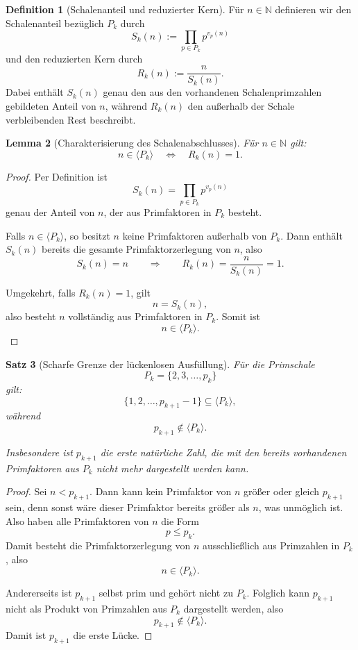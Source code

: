 \documentclass[11pt,a4paper]{article}
\newtheorem{satz}{Satz}
\newtheorem{lemma}[satz]{Lemma}
\theoremstyle{definition}
\newtheorem{definition}[satz]{Definition}
\theoremstyle{remark}
\begin{document}
	\begin{definition}[Schalenanteil und reduzierter Kern]
		Für \(n\in\mathbb N\) definieren wir den Schalenanteil bezüglich \(P_k\) durch
		\[
		S_k(n):=\prod_{p\in P_k} p^{v_p(n)}
		\]
		und den reduzierten Kern durch
		\[
		R_k(n):=\frac{n}{S_k(n)}.
		\]
		Dabei enthält \(S_k(n)\) genau den aus den vorhandenen Schalenprimzahlen gebildeten Anteil
		von \(n\), während \(R_k(n)\) den außerhalb der Schale verbleibenden Rest beschreibt.
	\end{definition}
	
	\begin{lemma}[Charakterisierung des Schalenabschlusses]
		\label{lem:schalenabschluss}
		Für \(n\in\mathbb N\) gilt:
		\[
		n\in \langle P_k\rangle
		\quad\Longleftrightarrow\quad
		R_k(n)=1.
		\]
	\end{lemma}
	
	\begin{proof}
		Per Definition ist
		\[
		S_k(n)=\prod_{p\in P_k} p^{v_p(n)}
		\]
		genau der Anteil von \(n\), der aus Primfaktoren in \(P_k\) besteht.
		
		\medskip
		\noindent
		Falls \(n\in \langle P_k\rangle\), so besitzt \(n\) keine Primfaktoren außerhalb von \(P_k\).
		Dann enthält \(S_k(n)\) bereits die gesamte Primfaktorzerlegung von \(n\), also
		\[
		S_k(n)=n
		\qquad\Longrightarrow\qquad
		R_k(n)=\frac{n}{S_k(n)}=1.
		\]
		
		\medskip
		\noindent
		Umgekehrt, falls \(R_k(n)=1\), gilt
		\[
		n=S_k(n),
		\]
		also besteht \(n\) vollständig aus Primfaktoren in \(P_k\). Somit ist
		\[
		n\in \langle P_k\rangle.
		\]
	\end{proof}
	
	\begin{satz}[Scharfe Grenze der lückenlosen Ausfüllung]
		\label{satz:scharfe_grenze_schale}
		Für die Primschale
		\[
		P_k=\{2,3,\dots,p_k\}
		\]
		gilt:
		\[
		\{1,2,\dots,p_{k+1}-1\}\subseteq \langle P_k\rangle,
		\]
		während
		\[
		p_{k+1}\notin \langle P_k\rangle.
		\]
		
		Insbesondere ist \(p_{k+1}\) die erste natürliche Zahl, die mit den bereits
		vorhandenen Primfaktoren aus \(P_k\) nicht mehr dargestellt werden kann.
	\end{satz}
	
	\begin{proof}
		Sei \(n<p_{k+1}\). Dann kann kein Primfaktor von \(n\) größer oder gleich \(p_{k+1}\) sein,
		denn sonst wäre dieser Primfaktor bereits größer als \(n\), was unmöglich ist. Also haben
		alle Primfaktoren von \(n\) die Form
		\[
		p\le p_k.
		\]
		Damit besteht die Primfaktorzerlegung von \(n\) ausschließlich aus Primzahlen in \(P_k\), also
		\[
		n\in \langle P_k\rangle.
		\]
		
		Andererseits ist \(p_{k+1}\) selbst prim und gehört nicht zu \(P_k\). Folglich kann
		\(p_{k+1}\) nicht als Produkt von Primzahlen aus \(P_k\) dargestellt werden, also
		\[
		p_{k+1}\notin \langle P_k\rangle.
		\]
		Damit ist \(p_{k+1}\) die erste Lücke.
	\end{proof}
	
\end{document}
